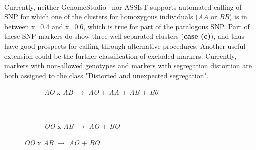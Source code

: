 \documentclass[a4paper,11pt,english]{article}
\newcommand{\reg}{\textsuperscript{\textregistered}}
\begin{document}
Currently, neither 
GenomeStudio\reg~ nor ASSIsT supports automated calling of SNP for which one of the clusters for
homozygous individuals (\emph{AA} or \emph{BB}) is in between x=0.4 and x=0.6, which is true for
part of the paralogous SNP.
Part of these SNP markers do show three well separated clusters (\textbf{case (c)}), and thus have
good
prospects for calling through alternative procedures.
Another useful extension could be the further classification of excluded markers. Currently, markers
with non-allowed genotypes and markers with segregation distortion are both assigned to the class
"Distorted and unexpected segregation".  

\begin{figure}[H]
      \captionsetup[subfigure]{}%
    	\begin{subfigure}[b]{0.5\textwidth}
          \caption{\emph{AO} x \emph{AB} \(\rightarrow\)  \emph{AO} + 
           \emph{AA} +  \emph{AB} +  \emph{B0}}
                \label{fig:gull}
        \end{subfigure}%
        ~
        \begin{subfigure}[b]{0.5\textwidth}
                \caption{\emph{OO} x \emph{AB} \(\rightarrow\)  \emph{AO} + 
           \emph{BO}}

\end{subfigure}
\end{figure}
\end{document}
